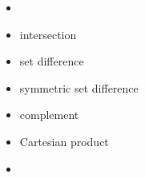 \documentclass{article}
\begin{document}
\begin{itemize}

\item {}


\item intersection


\item set difference

\item symmetric set difference


\item complement

%
\item Cartesian product


\item {}

\end{itemize}
\end{document}
